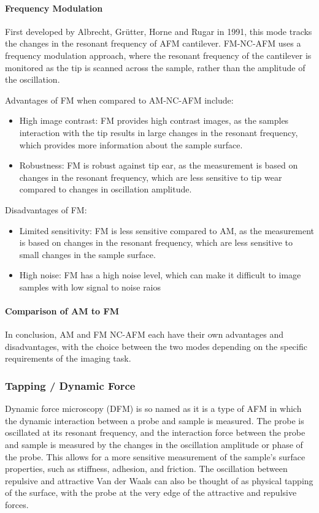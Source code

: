 \paragraph{Frequency Modulation}
First developed by Albrecht, Gr{\"u}tter, Horne and Rugar in 1991, this mode tracks the changes in the resonant frequency of AFM cantilever.
FM-NC-AFM uses a frequency modulation approach, where the resonant frequency of the cantilever is monitored as the tip is scanned across the sample, rather than the amplitude of the oscillation.

Advantages of FM when compared to AM-NC-AFM include:
\begin{itemize}
    \item High image contrast: FM provides high contrast images, as the samples interaction with the tip results in large changes in the resonant frequency, which provides more information about the sample surface.
    \item Robustness: FM is robust against tip ear, as the measurement is based on changes in the resonant frequency, which are less sensitive to tip wear compared to changes in oscillation amplitude.
\end{itemize}
Disadvantages of FM:
\begin{itemize}
    \item Limited sensitivity: FM is less sensitive compared to AM, as the measurement is based on changes in the resonant frequency, which are less sensitive to small changes in the sample surface.
    \item High noise: FM has a high noise level, which can make it difficult to image samples with low signal to noise raios
\end{itemize}

\paragraph{Comparison of AM to FM}
In conclusion, AM and FM NC-AFM each have their own advantages and disadvantages, with the choice between the two modes depending on the specific requirements of the imaging task.
\subsubsection{Tapping / Dynamic Force}
Dynamic force microscopy (DFM) is so named as it is a type of AFM in which the dynamic interaction between a probe and sample is measured. The probe is oscillated at its resonant frequency, and the interaction force between the probe and sample is measured by the changes in the oscillation amplitude or phase of the probe. This allows for a more sensitive measurement of the sample's surface properties, such as stiffness, adhesion, and friction. The oscillation between repulsive and attractive Van der Waals can also be thought of as physical tapping of the surface, with the probe at the very edge of the attractive and repulsive forces.

